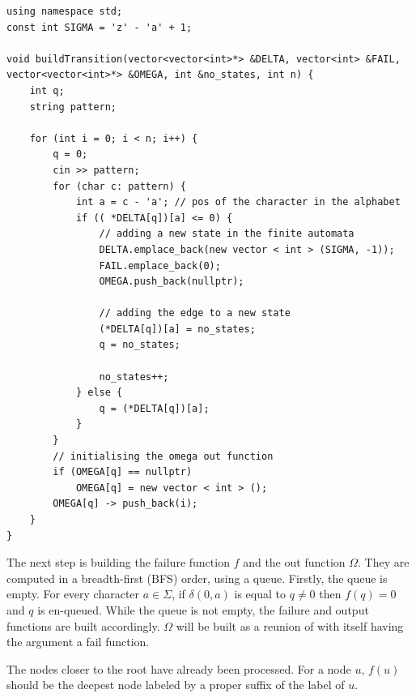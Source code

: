\documentclass[letterpaper]{article}
\begin{document}
\begin{lstlisting}
using namespace std;
const int SIGMA = 'z' - 'a' + 1;

void buildTransition(vector<vector<int>*> &DELTA, vector<int> &FAIL, vector<vector<int>*> &OMEGA, int &no_states, int n) {
    int q;
    string pattern;

    for (int i = 0; i < n; i++) {
        q = 0;
        cin >> pattern;
        for (char c: pattern) {
            int a = c - 'a'; // pos of the character in the alphabet
            if (( *DELTA[q])[a] <= 0) {
                // adding a new state in the finite automata
                DELTA.emplace_back(new vector < int > (SIGMA, -1));
                FAIL.emplace_back(0);
                OMEGA.push_back(nullptr);

                // adding the edge to a new state
                (*DELTA[q])[a] = no_states;
                q = no_states;

                no_states++;
            } else {
                q = (*DELTA[q])[a];
            }
        }
        // initialising the omega out function
        if (OMEGA[q] == nullptr)
            OMEGA[q] = new vector < int > ();
        OMEGA[q] -> push_back(i);
    }
}
\end{lstlisting}

The next step is building the failure function $f$ and the out function $\Omega$. They are computed in a breadth-first (BFS) order, using a queue. Firstly, the queue is empty. For every character $a \in \Sigma$, if $\delta(0, a)$ is equal to $q \neq 0$ then $f(q) = 0$ and $q$ is en-queued. While the queue is not empty, the failure and output functions are built accordingly. $\Omega$ will be built as a reunion of with itself having the argument a fail function.

The nodes closer to the root have already been processed. For a node $u$, $f(u)$ should be the deepest node labeled by a proper suffix of the label of $u$.
\end{document}
